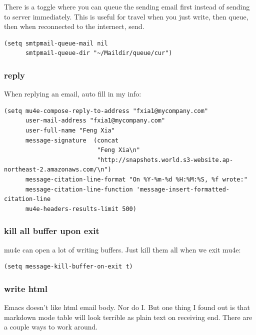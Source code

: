 \documentclass[11pt]{article}
\begin{document}
There is a toggle where you can queue the sending email first instead
of sending to server immediately. This is useful for travel when you
just write, then queue, then when reconnected to the internect, send.

\begin{verbatim}
(setq smtpmail-queue-mail nil
      smtpmail-queue-dir "~/Maildir/queue/cur")
\end{verbatim}
\subsubsection{reply}
\label{sec:org8f501d6}
When replying an email, auto fill in my info:
\begin{verbatim}
(setq mu4e-compose-reply-to-address "fxia1@mycompany.com"
      user-mail-address "fxia1@mycompany.com"
      user-full-name "Feng Xia"
      message-signature  (concat
                          "Feng Xia\n"
                          "http://snapshots.world.s3-website.ap-northeast-2.amazonaws.com/\n")
      message-citation-line-format "On %Y-%m-%d %H:%M:%S, %f wrote:"
      message-citation-line-function 'message-insert-formatted-citation-line
      mu4e-headers-results-limit 500)
\end{verbatim}
\subsubsection{kill all buffer upon exit}
\label{sec:org4a8d6d7}
mu4e can open a lot of writing buffers. Just kill them all when we exit mu4e:

\begin{verbatim}
(setq message-kill-buffer-on-exit t)
\end{verbatim}
\subsubsection{write html}
\label{sec:orga9705b7}
Emacs doesn't like html email body. Nor do I. But one thing I found
out is that markdown mode table will look terrible as plain text on
receiving end. There are a couple ways to work around.
\end{document}

